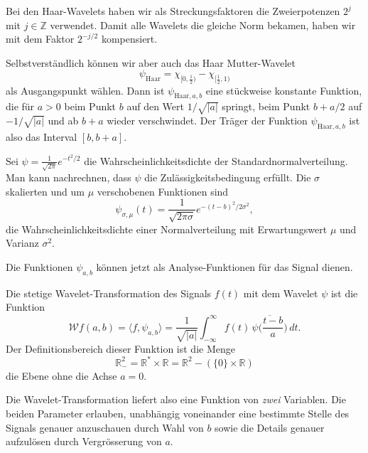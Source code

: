 \begin{beispiel}
Bei den Haar-Wavelets haben wir als Streckungsfaktoren die Zweierpotenzen
$2^j$ mit $j\in\mathbb Z$ verwendet.
Damit alle Wavelets die gleiche Norm bekamen, haben wir mit dem Faktor
$2^{-j/2}$ kompensiert.

Selbstverständlich können wir aber auch das Haar Mutter-Wavelet
\[
\psi_{\text{Haar}} = \chi_{[0,\frac12)} - \chi_{[\frac12,1)}
\]
als Ausgangspunkt wählen.
Dann ist $\psi_{\text{Haar},a,b}$ eine stückweise konstante Funktion,
die für $a>0$ beim Punkt $b$ auf den Wert $1/\sqrt{|a|}$ springt,
beim Punkt $b+a/2$ auf $-1/\sqrt{|a|}$ und ab $b+a$ wieder verschwindet.
Der Träger der Funktion $\psi_{\text{Haar},a,b}$ ist also das Interval
$[b,b+a]$.
\end{beispiel}

\begin{beispiel}
Sei $\psi=\frac1{\sqrt{2\pi}} e^{-t^2/2}$ die Wahrscheinlichkeitsdichte
der Standardnormalverteilung.
Man kann nachrechnen, dass $\psi$ die Zulässigkeitsbedingung erfüllt.
Die $\sigma$ skalierten und um $\mu$ verschobenen Funktionen sind
\[
\psi_{\sigma,\mu}(t)
=
\frac{1}{\sqrt{2\pi\sigma}} e^{-(t-b)^2/2\sigma^2},
\]
die Wahrscheinlichkeitsdichte einer Normalverteilung mit Erwartungswert $\mu$
und Varianz $\sigma^2$.
\end{beispiel}

Die Funktionen $\psi_{a,b}$ können jetzt als Analyse-Funktionen für das
Signal dienen.

\begin{definition}
Die stetige Wavelet-Transformation des Signals $f(t)$ mit dem Wavelet
$\psi$ ist die Funktion
\[
\mathcal{W}f (a,b)
=
\langle f,\psi_{a,b}\rangle
=
\frac{1}{\sqrt{|a|}}\int_{-\infty}^\infty f(t)\,\overline{
\psi\biggl(\frac{t-b}{a}\biggr)}\,dt.
\]
Der Definitionsbereich dieser Funktion ist die Menge
\[
\mathbb R^2_-
=
\mathbb R^*\times \mathbb R
=
\mathbb R^2 - (\{0\}\times \mathbb R)
\]
die Ebene ohne die Achse $a=0$.
\end{definition}

Die Wavelet-Transformation liefert also eine Funktion von {\em zwei}
Variablen.
Die beiden Parameter erlauben, unabhängig voneinander eine bestimmte
Stelle des Signals genauer anzuschauen durch Wahl von $b$ sowie die
Details genauer aufzulösen durch Vergrösserung von $a$.

